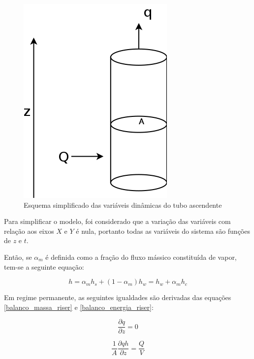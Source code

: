 \begin{figure}[H]
  \caption{\label{riser} Esquema simplificado das variáveis dinâmicas
    do tubo ascendente}
  \begin{center}
    \includegraphics[scale=0.3]{img/riser.png}
  \end{center}
\end{figure}

Para simplificar o modelo, foi considerado que a variação das
variáveis com relação aos eixos $X$ e $Y$ é nula, portanto todas as
variáveis do sistema são funções de $z$ e $t$.

Então, se $\alpha_m$ é definida como a fração do fluxo mássico
constituída de vapor, tem-se a seguinte equação:

\begin{equation}
  h=\alpha_m h_s + (1-\alpha_m) h_w = h_w + \alpha_m h_c
  \label{entalpia_mist_riser}
\end{equation}


Em regime permanente, as seguintes igualdades são derivadas das
equações \ref{balanco_massa_riser} e \ref{balanco_energia_riser}:

\begin{equation}
  \dfrac{\partial q}{\partial z} = 0
  \label{balanco_massa_riser_rp}
\end{equation}

\begin{equation}
  \dfrac{1}{A} \dfrac{\partial q h}{\partial z} = \dfrac{Q}{V}
  \label{balanco_energia_riser_rp}
\end{equation}


